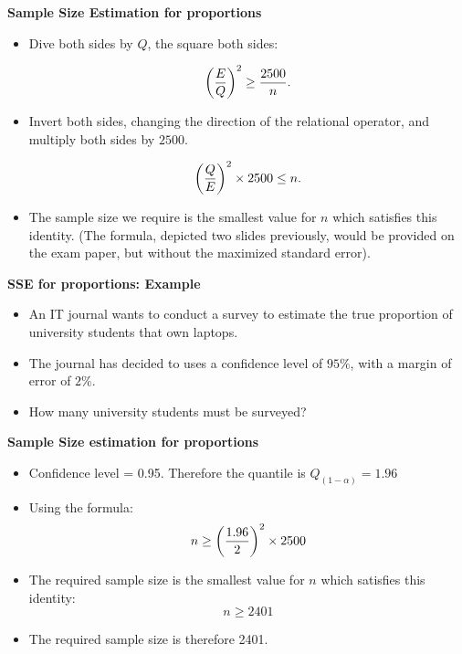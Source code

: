 
\textbf{Sample Size Estimation for proportions}

\begin{itemize}

\item  Dive both sides by $Q$, the square both sides:

\[ \left({E\over Q}\right)^2 \geq {2500 \over n}. \]

\item  Invert both sides, changing the direction of the relational operator, and multiply both sides by $2500$.

\[ \left({Q\over E}\right)^2 \times 2500 \leq n. \]

\item  The sample size we require is the smallest value for $n$ which satisfies this identity. (The formula,  depicted two slides previously, would be provided on the exam paper, but without the maximized standard error).
\end{itemize}


\textbf{SSE for proportions: Example}
\begin{itemize}
\item  An IT journal wants to conduct a survey to estimate the true proportion of university students that own laptops.
\item  The journal has decided to uses a confidence level of $95\%$, with a margin of error of $2\%$.
\item  How many university students must be surveyed?
\end{itemize}



\textbf{Sample Size estimation for proportions}

\begin{itemize}
\item  Confidence level = 0.95. Therefore the quantile is $Q_{(1-\alpha)} = 1.96$
\item  Using the formula: \[ n \geq \left({1.96 \over 2 }\right)^2 \times 2500  \]
\item  The required sample size is the smallest value for $n$ which satisfies this identity: \[ n \geq 2401  \]
\item  The required sample size is therefore 2401.
\end{itemize}

